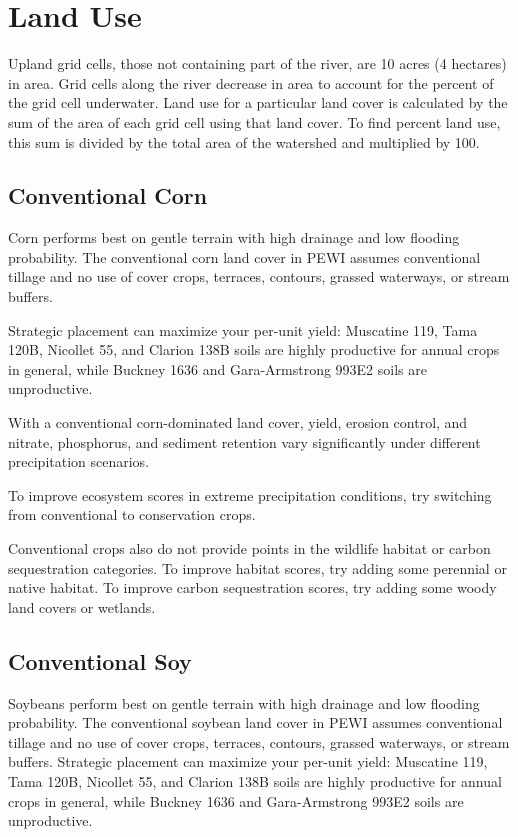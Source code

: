 \documentclass[11pt]{article}
\begin{document}

\section{Land Use}\label{sec:landuse}
Upland grid cells, those not containing part of the river, are 10 acres (4 hectares) in area. Grid cells along the river decrease in area to account for the percent of the grid cell underwater. Land use for a particular land cover is calculated by the sum of the area of each grid cell using that land cover. To find percent land use, this sum is divided by the total area of the watershed and multiplied by 100.

\subsection{Conventional Corn}

Corn performs best on gentle terrain with high drainage and low flooding probability. The conventional corn land cover in PEWI assumes conventional tillage and no use of cover crops, terraces, contours, grassed waterways, or stream buffers.

Strategic placement can maximize your per-unit yield: Muscatine 119, Tama 120B, Nicollet 55, and Clarion 138B soils are highly productive for annual crops in general, while Buckney 1636 and Gara-Armstrong 993E2 soils are unproductive.
 
With a conventional corn-dominated land cover, yield, erosion control, and nitrate, phosphorus, and sediment retention vary significantly under different precipitation scenarios. 

To improve ecosystem scores in extreme precipitation conditions, try switching from conventional to conservation crops.

Conventional crops also do not provide points in the wildlife habitat or carbon sequestration categories. To improve habitat scores, try adding some perennial or native habitat. To improve carbon sequestration scores, try adding some woody land covers or wetlands.


\subsection{Conventional Soy}

Soybeans perform best on gentle terrain with high drainage and low flooding probability. The conventional soybean land cover in PEWI assumes conventional tillage and no use of cover crops, terraces, contours, grassed waterways, or stream buffers. 
Strategic placement can maximize your per-unit yield: Muscatine 119, Tama 120B, Nicollet 55, and Clarion 138B soils are highly productive for annual crops in general, while Buckney 1636 and Gara-Armstrong 993E2 soils are unproductive.
 
\end{document}
